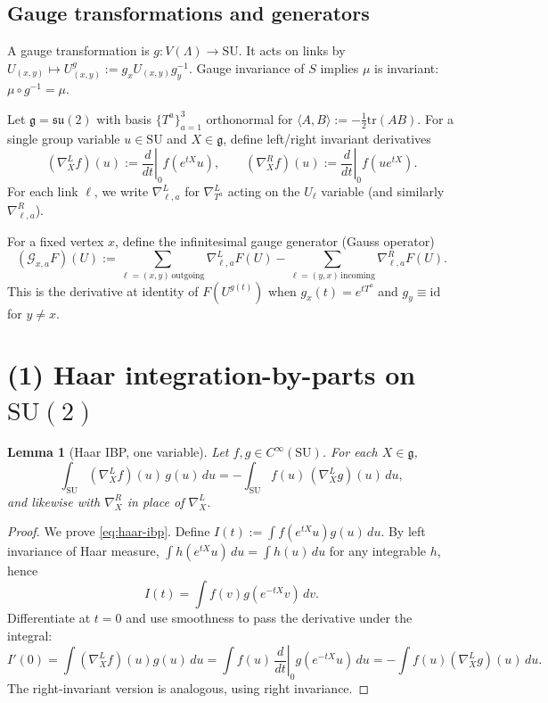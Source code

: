 \documentclass[11pt]{article}
\newtheorem{lemma}[theorem]{Lemma}
\theoremstyle{definition}
\newcommand{\SU}{\mathrm{SU}}
\newcommand{\tr}{\mathrm{tr}}
\newcommand{\1}{\mathbf{1}}
\newcommand{\g}{\mathfrak{g}}
\begin{document}
\subsection{Gauge transformations and generators}
A gauge transformation is $g:V(\Lambda)\to \SU$.
It acts on links by $U_{(x,y)}\mapsto U^g_{(x,y)} := g_x U_{(x,y)} g_y^{-1}$.
Gauge invariance of $S$ implies $\mu$ is invariant: $\mu\circ g^{-1}=\mu$.

Let $\g=\mathfrak{su}(2)$ with basis $\{T^a\}_{a=1}^3$ orthonormal for $\langle A,B\rangle:=-\tfrac12\tr(AB)$.
For a single group variable $u\in \SU$ and $X\in\g$, define left/right invariant derivatives
\begin{equation}
  (\nabla^{L}_X f)(u) := \left.\frac{d}{dt}\right|_{0} f(e^{tX}u),\qquad
  (\nabla^{R}_X f)(u) := \left.\frac{d}{dt}\right|_{0} f(ue^{tX}).
\end{equation}
For each link $\ell$, we write $\nabla^{L}_{\ell,a}$ for $\nabla^L_{T^a}$ acting on the $U_\ell$ variable (and similarly $\nabla^{R}_{\ell,a}$).

For a fixed vertex $x$, define the infinitesimal gauge generator (Gauss operator)
\begin{equation}\label{eq:gauss-generator}
  (\mathcal{G}_{x,a} F)(U)
  := \sum_{\ell=(x,y)\,\text{outgoing}} \nabla^{L}_{\ell,a} F(U)
     - \sum_{\ell=(y,x)\,\text{incoming}} \nabla^{R}_{\ell,a} F(U).
\end{equation}
This is the derivative at identity of $F(U^{g(t)})$ when $g_x(t)=e^{tT^a}$ and $g_y\equiv \mathrm{id}$ for $y\neq x$.

\section{(1) Haar integration-by-parts on $\SU(2)$}

\begin{lemma}[Haar IBP, one variable]\label{lem:haar-ibp}
Let $f,g\in C^\infty(\SU)$.
For each $X\in\g$,
\begin{equation}\label{eq:haar-ibp}
  \int_{\SU} (\nabla^{L}_X f)(u)\, g(u)\,du
  = -\int_{\SU} f(u)\, (\nabla^{L}_X g)(u)\,du,
\end{equation}
and likewise with $\nabla^{R}_X$ in place of $\nabla^{L}_X$.
\end{lemma}

\begin{proof}
We prove \eqref{eq:haar-ibp}.
Define $I(t):=\int f(e^{tX}u)g(u)\,du$.
By left invariance of Haar measure, $\int h(e^{tX}u)\,du=\int h(u)\,du$ for any integrable $h$, hence
\begin{equation*}
 I(t)=\int f(v) g(e^{-tX}v)\,dv.
\end{equation*}
Differentiate at $t=0$ and use smoothness to pass the derivative under the integral:
\begin{equation*}
 I'(0)=\int (\nabla^L_X f)(u) g(u)\,du
      =\int f(u)\,\left.\frac{d}{dt}\right|_{0} g(e^{-tX}u)\,du
      =-\int f(u)(\nabla^L_X g)(u)\,du.
\end{equation*}
The right-invariant version is analogous, using right invariance.
\end{proof}
\end{document}
